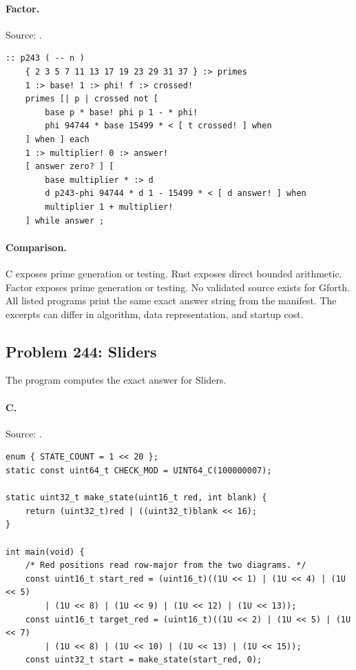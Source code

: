 \paragraph{Factor.} Source: .
\begin{lstlisting}
:: p243 ( -- n )
    { 2 3 5 7 11 13 17 19 23 29 31 37 } :> primes
    1 :> base! 1 :> phi! f :> crossed!
    primes [| p | crossed not [
        base p * base! phi p 1 - * phi!
        phi 94744 * base 15499 * < [ t crossed! ] when
    ] when ] each
    1 :> multiplier! 0 :> answer!
    [ answer zero? ] [
        base multiplier * :> d
        d p243-phi 94744 * d 1 - 15499 * < [ d answer! ] when
        multiplier 1 + multiplier!
    ] while answer ;
\end{lstlisting}

\paragraph{Comparison.}
C exposes prime generation or testing. Rust exposes direct bounded arithmetic. Factor exposes prime generation or testing.
No validated source exists for Gforth.
All listed programs print the same exact answer string from the manifest. The excerpts can differ in algorithm, data representation, and startup cost.

\subsection{Problem 244: Sliders}
\label{walkthrough:p244}
The program computes the exact answer for Sliders.

\paragraph{C.} Source: .
\begin{lstlisting}
enum { STATE_COUNT = 1 << 20 };
static const uint64_t CHECK_MOD = UINT64_C(100000007);

static uint32_t make_state(uint16_t red, int blank) {
    return (uint32_t)red | ((uint32_t)blank << 16);
}

int main(void) {
    /* Red positions read row-major from the two diagrams. */
    const uint16_t start_red = (uint16_t)((1U << 1) | (1U << 4) | (1U << 5)
        | (1U << 8) | (1U << 9) | (1U << 12) | (1U << 13));
    const uint16_t target_red = (uint16_t)((1U << 2) | (1U << 5) | (1U << 7)
        | (1U << 8) | (1U << 10) | (1U << 13) | (1U << 15));
    const uint32_t start = make_state(start_red, 0);
\end{lstlisting}

